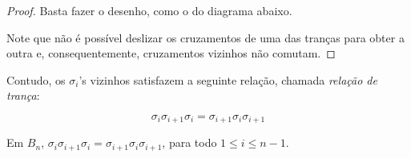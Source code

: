 	\begin{proof}
		Basta fazer o desenho, como o do diagrama abaixo.%
		
		\begin{center}
		\end{center}
		
		\par\vspace{0.3cm} Note que não é possível deslizar os cruzamentos de uma das tranças para obter a outra e, consequentemente, cruzamentos vizinhos não comutam. 
		
	\end{proof}
	
	\par\vspace{0.3cm} Contudo, os $\sigma_i$'s vizinhos satisfazem a seguinte relação, chamada \textit{relação de trança}:
	
	\begin{equation*}
	\sigma_i\sigma_{i+1}\sigma_i = \sigma_{i+1}\sigma_i\sigma_{i+1}
	\end{equation*}
	
	\par\vspace{0.3cm} 
	
	\begin{lemma}
		Em $B_n$, $\sigma_i\sigma_{i+1}\sigma_i = \sigma_{i+1}\sigma_i\sigma_{i+1}$, para todo $1\leq i\leq n-1$. 
	\end{lemma}
	

